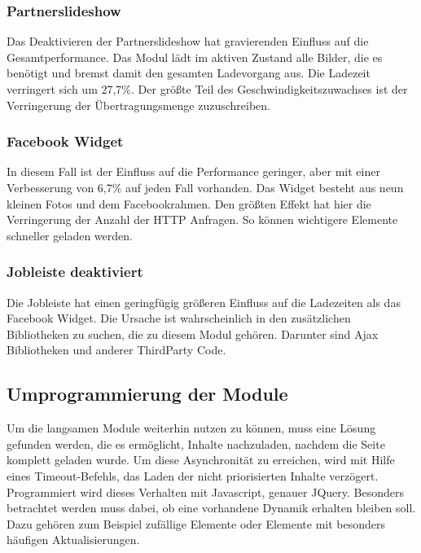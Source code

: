 \subsubsection{Partnerslideshow} Das Deaktivieren der Partnerslideshow hat gravierenden Einfluss auf die Gesamtperformance. Das Modul lädt im aktiven Zustand alle Bilder, die es benötigt und bremst damit den gesamten Ladevorgang aus. Die Ladezeit verringert sich um 27,7\%. Der größte Teil des Geschwindigkeitszuwachses ist der Verringerung der Übertragungsmenge zuzuschreiben. 

\subsubsection{Facebook Widget} In diesem Fall ist der Einfluss auf die Performance geringer, aber mit einer Verbesserung von 6,7\% auf jeden Fall vorhanden. Das Widget besteht aus neun kleinen Fotos und dem Facebookrahmen. Den größten Effekt hat hier die Verringerung der Anzahl der HTTP Anfragen. So können wichtigere Elemente schneller geladen werden.

\subsubsection{Jobleiste deaktiviert} Die Jobleiste hat einen geringfügig größeren Einfluss auf die Ladezeiten als das Facebook Widget. Die Ursache ist wahrscheinlich in den zusätzlichen Bibliotheken zu suchen, die zu diesem Modul gehören. Darunter sind Ajax Bibliotheken und anderer ThirdParty Code. 

\subsection{Umprogrammierung der Module}
Um die langsamen Module weiterhin nutzen zu können, muss eine Lösung gefunden werden, die es ermöglicht, Inhalte nachzuladen, nachdem die Seite komplett geladen wurde. Um diese Asynchronität zu erreichen, wird mit Hilfe eines Timeout-Befehls, das Laden der nicht priorisierten Inhalte verzögert. Programmiert wird dieses Verhalten mit Javascript, genauer JQuery. Besonders betrachtet werden muss dabei, ob eine vorhandene Dynamik erhalten bleiben soll. Dazu gehören zum Beispiel zufällige Elemente oder Elemente mit besonders häufigen Aktualisierungen.

